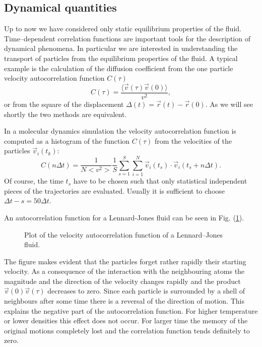 \subsection{Dynamical quantities}
Up to now we have considered only static equilibrium properties of the fluid.
Time--dependent correlation functions are important tools for the description
of dynamical phenomena. In particular we are interested in understanding the
transport of particles from the equilibrium properties of the fluid. 
A typical example is the calculation of the diffusion
coefficient from the one particle velocity autocorrelation function $C(\tau)$
\begin{displaymath}
  C(\tau) = \frac{\langle \vec{v}(\tau) \vec{v}(0) \rangle}{v^2},
\end{displaymath}
or from the square of the displacement 
$\Delta(t) = \vec{r}(t) - \vec{r}(0)$. As we will
see shortly the two methods are equivalent. 

In a molecular dynamics simulation the velocity autocorrelation function is
computed as a histogram of the function $C(\tau)$ from the velocities of the
particles $\vec{v}_i(t_k)$:
\begin{displaymath}
  C(n \Delta t) =  \frac{1}{N<v^2>} \frac{1}{S} \sum_{s=1}^S \sum_{i=1}^N
                     \vec{v}_i(t_s) \cdot \vec{v}_i(t_s +n\Delta t).
\end{displaymath}
Of course, the time $t_s$ have to be chosen such that only statistical
independent pieces of the trajectories are evaluated. Usually it is sufficient
to choose $\Delta t-s =50 \Delta t$.

An autocorrelation function for a Lennard-Jones fluid can be seen in 
Fig. (\ref{fig:AutoCorrMD}).

\begin{figure}[htbp]
  \begin{center}
    
    \caption{Plot of the velocity autocorrelation function of a 
            Lennard--Jones fluid.}
    \label{fig:AutoCorrMD}
  \end{center}
\end{figure}

The figure makes evident that the particles forget rather rapidly their
starting velocity. As a consequence of the interaction with the
neighbouring atoms the magnitude and the direction of the velocity changes
rapidly and the product $\vec{v}(0) \vec{v}(\tau)$ decreases to zero. Since
each particle is surrounded by a shell of neighbours after some time there is
a reversal of the direction of motion. This explains the negative part of the
autocorrelation function. For higher temperature or lower densities this
effect does not occur. For larger time the memory of the original motions 
completely lost and the correlation function tends definitely to zero.

